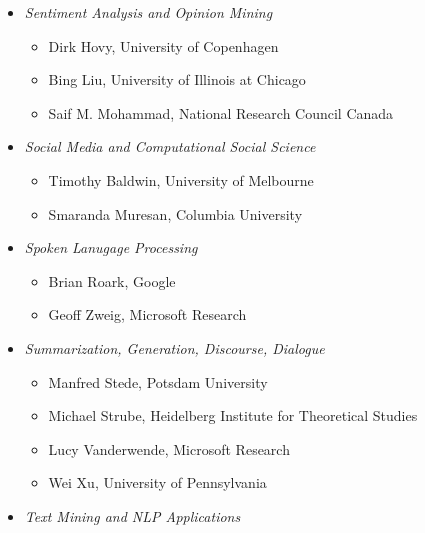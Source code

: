\begin{itemize}[itemsep=7pt, leftmargin=0cm, label={}]
\begin{itemize}[leftmargin=0.5cm, itemsep=6pt, label={}]
\item \emph{Sentiment Analysis and Opinion Mining}

\begin{itemize}[nosep, leftmargin=0.5cm, label={}]
\item Dirk Hovy, University of Copenhagen 
\item   Bing Liu, University of Illinois at Chicago  
\item    Saif M. Mohammad, National Research Council Canada 
\end{itemize}

\item \emph{Social Media and Computational Social Science}

\begin{itemize}[nosep, leftmargin=0.5cm, label={}]
\item Timothy Baldwin, University of Melbourne 
\item    Smaranda Muresan,  Columbia University 
\end{itemize}

\item \emph{Spoken Lanugage Processing}

\begin{itemize}[nosep, leftmargin=0.5cm, label={}]
\item Brian Roark, Google 
\item    Geoff Zweig, Microsoft Research 
\end{itemize}

\item \emph{Summarization, Generation, Discourse, Dialogue}

\begin{itemize}[nosep, leftmargin=0.5cm, label={}]
\item Manfred Stede, Potsdam University 
\item    Michael Strube, Heidelberg Institute for Theoretical Studies 
\item    Lucy Vanderwende, Microsoft Research 
\item    Wei Xu, University of Pennsylvania 
\end{itemize}

\item \emph{Text Mining and NLP Applications}


\end{itemize}
\end{itemize}
